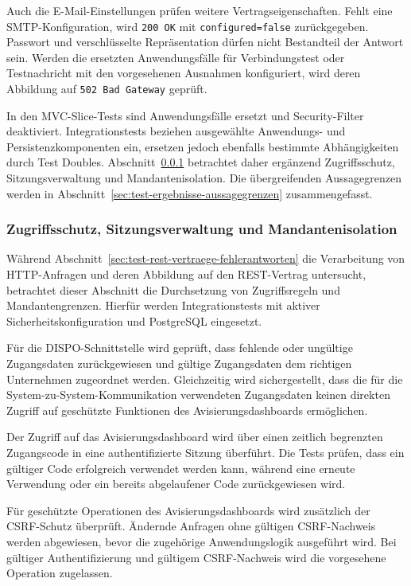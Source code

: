 \documentclass[
  12pt,
  a4paper,
  oneside
]{article}
\begin{document}
Auch die E-Mail-Einstellungen prüfen weitere Vertragseigenschaften. Fehlt eine
SMTP-Konfiguration, wird \texttt{200 OK} mit \texttt{configured=false}
zurückgegeben. Passwort und verschlüsselte Repräsentation dürfen nicht
Bestandteil der Antwort sein. Werden die ersetzten Anwendungsfälle für
Verbindungstest oder Testnachricht mit den vorgesehenen Ausnahmen konfiguriert,
wird deren Abbildung auf \texttt{502 Bad Gateway} geprüft.

In den MVC-Slice-Tests sind Anwendungsfälle ersetzt und Security-Filter
deaktiviert. Integrationstests beziehen ausgewählte Anwendungs- und
Persistenzkomponenten ein, ersetzen jedoch ebenfalls bestimmte Abhängigkeiten
durch Test Doubles. Abschnitt~\ref{sec:test-zugriffsschutz-mandantenisolation}
betrachtet daher ergänzend Zugriffsschutz, Sitzungsverwaltung und
Mandantenisolation. Die übergreifenden Aussagegrenzen werden in
Abschnitt~\ref{sec:test-ergebnisse-aussagegrenzen} zusammengefasst.

\subsubsection{Zugriffsschutz, Sitzungsverwaltung und Mandantenisolation}
\label{sec:test-zugriffsschutz-mandantenisolation}

Während Abschnitt~\ref{sec:test-rest-vertraege-fehlerantworten} die Verarbeitung
von HTTP-Anfragen und deren Abbildung auf den REST-Vertrag untersucht,
betrachtet dieser Abschnitt die Durchsetzung von Zugriffsregeln und
Mandantengrenzen. Hierfür werden Integrationstests mit aktiver
Sicherheitskonfiguration und PostgreSQL eingesetzt.

Für die DISPO-Schnittstelle wird geprüft, dass fehlende oder ungültige
Zugangsdaten zurückgewiesen und gültige Zugangsdaten dem richtigen Unternehmen
zugeordnet werden. Gleichzeitig wird sichergestellt, dass die für die
System-zu-System-Kommunikation verwendeten Zugangsdaten keinen direkten Zugriff
auf geschützte Funktionen des Avisierungsdashboards ermöglichen.

Der Zugriff auf das Avisierungsdashboard wird über einen zeitlich begrenzten
Zugangscode in eine authentifizierte Sitzung überführt. Die Tests prüfen, dass
ein gültiger Code erfolgreich verwendet werden kann, während eine erneute
Verwendung oder ein bereits abgelaufener Code zurückgewiesen wird.

Für geschützte Operationen des Avisierungsdashboards wird zusätzlich der
CSRF-Schutz überprüft. Ändernde Anfragen ohne gültigen CSRF-Nachweis werden
abgewiesen, bevor die zugehörige Anwendungslogik ausgeführt wird. Bei gültiger
Authentifizierung und gültigem CSRF-Nachweis wird die vorgesehene Operation
zugelassen.
\end{document}
